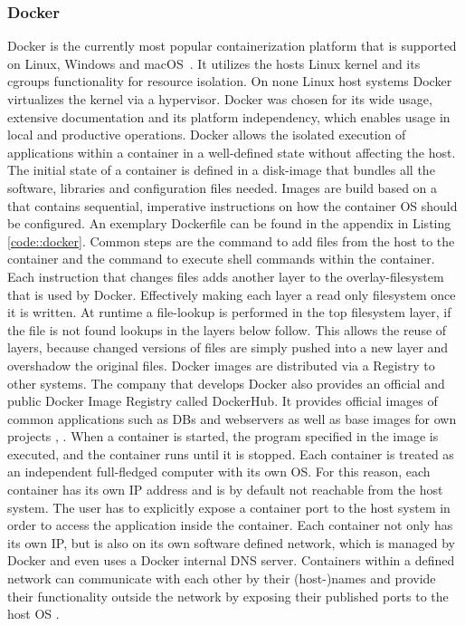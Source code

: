 \documentclass[12pt, a4paper]{article}
\begin{document}
        \subsubsection{Docker}\label{sssec::docker}
        Docker is the currently most popular containerization platform that is supported on Linux, Windows and macOS~\cite{docker_share}. It utilizes the hosts Linux kernel and its cgroups functionality for resource isolation. On none Linux host systems Docker virtualizes the kernel via a hypervisor. Docker was chosen for its wide usage, extensive documentation and its platform independency, which enables usage in local and productive operations.\newline
        Docker allows the isolated execution of applications within a container in a well-defined state without affecting the host. The initial state of a container is defined in a disk-image that bundles all the software, libraries and configuration files needed. Images are build based on a  that contains sequential, imperative instructions on how the container \ac{OS} should be configured. An exemplary Dockerfile can be found in the appendix in Listing \ref{code::docker}. Common steps are the  command to add files from the host to the container and the  command to execute shell commands within the container. Each instruction that changes files adds another layer to the overlay-filesystem that is used by Docker. Effectively making each layer a read only filesystem once it is written. At runtime a file-lookup is performed in the top filesystem layer, if the file is not found lookups in the layers below follow. This allows the reuse of layers, because changed versions of files are simply pushed into a new layer and overshadow the original files. Docker images are distributed via a Registry to other systems. The company that develops Docker also provides an official and public Docker Image Registry called DockerHub. It provides official images of common applications such as \acl{DB}s and webservers as well as base images for own projects \cite{docker2020}, \cite{dockerdocs}.\newline
        When a container is started, the program specified in the image is executed, and the container runs until it is stopped. Each container is treated as an independent full-fledged computer with its own \ac{OS}. For this reason, each container has its own \acs{IP} address and is by default not reachable from the host system. The user has to explicitly expose a container port to the host system in order to access the application inside the container. Each container not only has its own \acs{IP}, but is also on its own software defined network, which is managed by Docker and even uses a Docker internal \ac{DNS} server. Containers within a defined network can communicate with each other by their (host-)names and provide their functionality outside the network by exposing their published ports to the host \ac{OS} \cite{docker2020}.\newline
\end{document}
